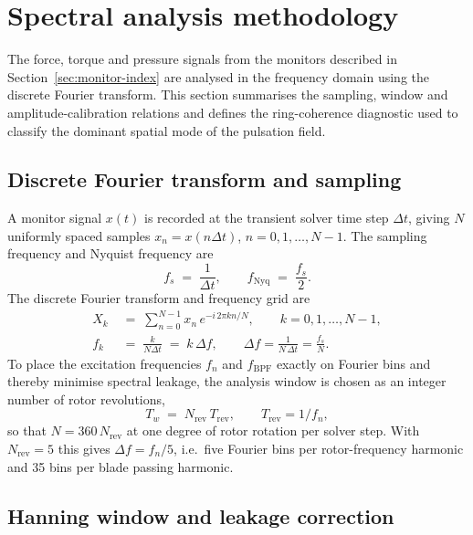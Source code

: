 \section{Spectral analysis methodology}
\label{sec:spec}

The force, torque and pressure signals from the monitors described
in Section~\ref{sec:monitor-index} are analysed in the frequency
domain using the discrete Fourier transform. This section summarises
the sampling, window and amplitude-calibration relations and defines
the ring-coherence diagnostic used to classify the dominant spatial
mode of the pulsation field.

\subsection{Discrete Fourier transform and sampling}
\label{sec:spec-dft}

A monitor signal $x(t)$ is recorded at the transient solver time
step $\Delta t$, giving $N$ uniformly spaced samples
$x_n = x(n\Delta t)$, $n = 0,1,\dots,N-1$. The sampling frequency
and Nyquist frequency are
\begin{equation}
    f_s \;=\; \frac{1}{\Delta t},\qquad
    f_{\mathrm{Nyq}} \;=\; \frac{f_s}{2}. \label{eq:fs_fnyq}
\end{equation}
The discrete Fourier transform and frequency grid are
\begin{align}
    X_k &\;=\; \sum_{n=0}^{N-1} x_n\, e^{-i\,2\pi k n / N},
    \qquad k = 0,1,\dots,N-1, \label{eq:dft}\\
    f_k &\;=\; \frac{k}{N\Delta t} \;=\; k\,\Delta f,
    \qquad \Delta f = \frac{1}{N\,\Delta t} = \frac{f_s}{N}.
    \label{eq:dft_f}
\end{align}
To place the excitation frequencies $f_n$ and $f_{\mathrm{BPF}}$
exactly on Fourier bins and thereby minimise spectral leakage, the
analysis window is chosen as an integer number of rotor revolutions,
\begin{equation}
    T_w \;=\; N_{\mathrm{rev}}\,T_{\mathrm{rev}},
    \qquad T_{\mathrm{rev}} = 1/f_n, \label{eq:Tw}
\end{equation}
so that $N = 360\,N_{\mathrm{rev}}$ at one degree of rotor rotation
per solver step. With $N_{\mathrm{rev}}=5$ this gives
$\Delta f = f_n/5$, i.e.\ five Fourier bins per rotor-frequency harmonic and
35 bins per blade passing harmonic.

\subsection{Hanning window and leakage correction}
\label{sec:spec-window}

